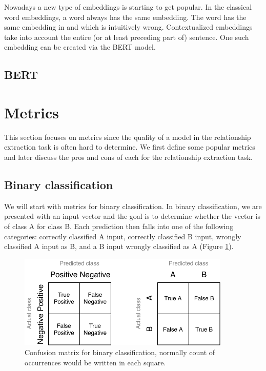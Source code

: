 Nowadays a new type of embeddings is starting to get popular. In the classical word embeddings, a word always has the same embedding. The word  has the same embedding in  and  which is intuitively wrong. Contextualized embeddings take into account the entire (or at least preceding part of) sentence. One such embedding can be created via the BERT model.

\subsection{BERT}


\section{Metrics}
This section focuses on metrics since the quality of a model in the relationship extraction task is often hard to determine. We first define some popular metrics and later discuss the pros and cons of each for the relationship extraction task.

\subsection{Binary classification}

We will start with metrics for binary classification. In binary classification, we are presented with an input vector and the goal is to determine whether the vector is of class A for class B. Each prediction then falls into one of the following categories: correctly classified A input, correctly classified B input, wrongly classified A input as B, and a B input wrongly classified as A (Figure \ref{obr:CM}). 

\begin{figure}[h]\centering
\includegraphics[width=0.9\textwidth]{./img//Diplomka diagramy-Confusion matric}
\caption{Confusion matrix for binary classification, normally count of occurrences would be written in each square. }
\label{obr:CM}
\end{figure}

